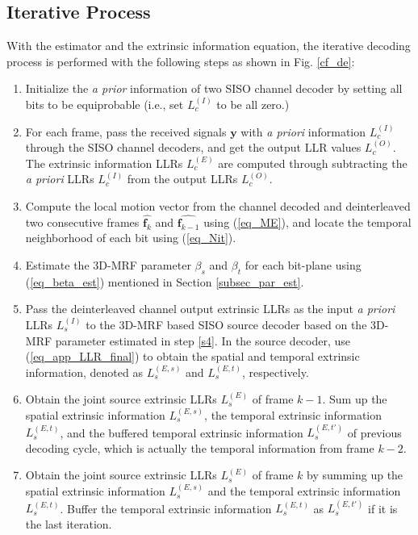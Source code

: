 \documentclass[10pt,twocolumn,twoside]{IEEEtran}
\begin{document}
\subsection{Iterative Process}\label{subsec_iter_process}
With the estimator and the extrinsic information equation, the iterative decoding process is performed with the following steps as shown in Fig. \ref{cf_de}:
\begin{enumerate}
\item \label{s1} Initialize the {\it a prior} information of two SISO channel decoder by setting all bits to be equiprobable (i.e., set $L_c^{(I)}$ to be all zero.)

\item \label{s2} For each frame, pass the received signals $\mathbf{y}$ with {\it a priori} information $L_c^{(I)}$ through the SISO channel decoders, and get the output LLR values $L_c^{(O)}$. The extrinsic information LLRs $L_c^{(E)}$ are computed through subtracting the {\it a priori} LLRs $L_c^{(I)}$ from the output LLRs $L_c^{(O)}$.

\item \label{s3} Compute the local motion vector from the channel decoded and deinterleaved two consecutive frames $\hat{\mathbf{f}_k}$ and $\hat{\mathbf{f}_{k-1}}$ using (\ref{eq_ME}), and locate the temporal neighborhood of each bit using (\ref{eq_Nit}).

\item \label{s4} Estimate the 3D-MRF parameter $\beta_s$ and $\beta_t$ for each bit-plane using (\ref{eq_beta_est}) mentioned in Section \ref{subsec_par_est}.

\item \label{s5} Pass the deinterleaved channel output extrinsic LLRs as the input {\it a priori} LLRs $L_s^{(I)}$ to the 3D-MRF based SISO source decoder based on the 3D-MRF parameter estimated in step \ref{s4}. In the source decoder, use (\ref{eq_app_LLR_final}) to obtain the spatial and temporal extrinsic information, denoted as $L_s^{(E,s)}$ and $L_s^{(E,t)}$, respectively.

\item \label{s6} Obtain the joint source extrinsic LLRs $L_s^{(E)}$ of frame $k-1$. Sum up the spatial extrinsic information $L_s^{(E,s)}$, the temporal extrinsic information $L_s^{(E,t)}$, and the buffered temporal extrinsic information $L_s^{(E,t')}$ of previous decoding cycle, which is actually the temporal information from frame $k-2$.

\item \label{s6'} Obtain the joint source extrinsic LLRs $L_s^{(E)}$ of frame $k$ by summing up the spatial extrinsic information $L_s^{(E,s)}$ and the temporal extrinsic information $L_s^{(E,t)}$. Buffer the temporal extrinsic information $L_s^{(E,t)}$ as $L_s^{(E,t')}$ if it is the last iteration.


\end{enumerate}
\end{document}
